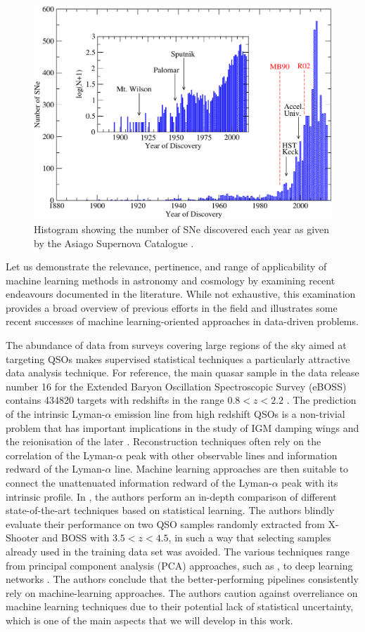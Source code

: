 \begin{figure}
    \centering
    \includegraphics[width=0.7\linewidth]{img//ML/fig1_color.pdf}
    \caption{Histogram showing the number of SNe discovered each year as given by the Asiago Supernova Catalogue \cite{SN_year}. }
    \label{fig:Supernovas_per_year}
\end{figure}



Let us demonstrate the relevance, pertinence, and range of applicability of machine learning methods in astronomy and cosmology by examining recent endeavours documented in the literature. While not exhaustive, this examination provides a broad overview of previous efforts in the field and illustrates some recent successes of machine learning-oriented approaches in data-driven problems.
\par
The abundance of data from surveys covering large regions of the sky aimed at targeting QSOs makes supervised statistical techniques a particularly attractive data analysis technique. For reference, the main quasar sample in the data release number 16 for the Extended Baryon Oscillation Spectroscopic Survey (eBOSS) contains 434820 targets with redshifts in the range $0.8<z<2.2$ \cite{eboss}. The prediction of the intrinsic Lyman-$\alpha$ emission line from high redshift QSOs is a non-trivial problem that has important implications in the study of IGM damping wings and the reionisation of the later \cite{MiraldaEscude_IGM}. Reconstruction techniques often rely on the correlation of the Lyman-$\alpha$ peak with other observable lines and information redward of the Lyman-$\alpha$ line. Machine learning approaches are then suitable to connect the unattenuated information redward of the Lyman-$\alpha$ peak with its intrinsic profile. In  \cite{qso_challenge}, the authors perform an in-depth comparison of different state-of-the-art techniques based on statistical learning. The authors blindly evaluate their performance on two QSO samples randomly extracted from X-Shooter and BOSS with $3.5<z<4.5$, in such a way that selecting samples already used in the training data set was avoided. The various techniques range from principal component analysis (PCA) approaches, such as \cite{Bosman2021_pca}, to deep learning networks \cite{Liu2021}. The authors conclude that the better-performing pipelines consistently rely on machine-learning approaches. The authors caution against overreliance on machine learning techniques due to their potential lack of statistical uncertainty, which is one of the main aspects that we will develop in this work.


